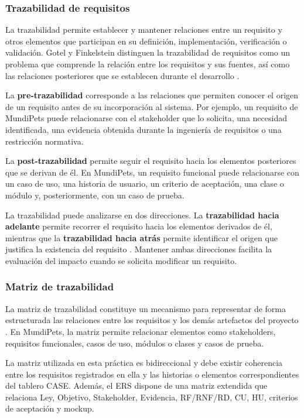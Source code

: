 \documentclass[journal,onecolumn]{IEEEtran}
\begin{document}
	\subsubsection{Trazabilidad de requisitos}
	
	La trazabilidad permite establecer y mantener relaciones entre un requisito y otros elementos que
	participan en su definición, implementación, verificación o validación. Gotel y Finkelstein
	distinguen la trazabilidad de requisitos como un problema que comprende la relación entre los
	requisitos y sus fuentes, así como las relaciones posteriores que se establecen durante el
	desarrollo \cite{gotel1994}.
	
	La \textbf{pre-trazabilidad} corresponde a las relaciones que permiten conocer el origen de un
	requisito antes de su incorporación al sistema. Por ejemplo, un requisito de MundiPets puede
	relacionarse con el stakeholder que lo solicita, una necesidad identificada, una evidencia
	obtenida durante la ingeniería de requisitos o una restricción normativa.
	
	La \textbf{post-trazabilidad} permite seguir el requisito hacia los elementos posteriores que se
	derivan de él. En MundiPets, un requisito funcional puede relacionarse con un caso de uso, una
	historia de usuario, un criterio de aceptación, una clase o módulo y, posteriormente, con un caso
	de prueba.
	
	La trazabilidad puede analizarse en dos direcciones. La \textbf{trazabilidad hacia adelante}
	permite recorrer el requisito hacia los elementos derivados de él, mientras que la
	\textbf{trazabilidad hacia atrás} permite identificar el origen que justifica la existencia del
	requisito \cite{clelandhuang2012}. Mantener ambas direcciones facilita la evaluación del impacto
	cuando se solicita modificar un requisito.
	
	\subsubsection{Matriz de trazabilidad}
	
	La matriz de trazabilidad constituye un mecanismo para representar de forma estructurada las
	relaciones entre los requisitos y los demás artefactos del proyecto \cite{clelandhuang2012}. En
	MundiPets, la matriz permite relacionar elementos como stakeholders, requisitos funcionales, casos
	de uso, módulos o clases y casos de prueba.
	
	La matriz utilizada en esta práctica es bidireccional y debe existir coherencia entre los
	requisitos registrados en ella y las historias o elementos correspondientes del tablero CASE.
	Además, el ERS dispone de una matriz extendida que relaciona Ley, Objetivo, Stakeholder,
	Evidencia, RF/RNF/RD, CU, HU, criterios de aceptación y mockup.
	
\end{document}
